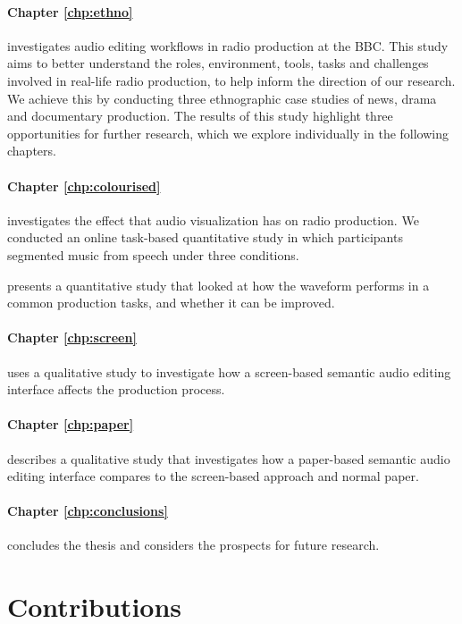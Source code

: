 \paragraph{Chapter \ref{chp:ethno}} investigates audio editing workflows in radio production at the BBC.  This study
aims to better understand the roles, environment, tools, tasks and challenges involved in real-life radio production,
to help inform the direction of our research.  We achieve this by conducting three ethnographic case studies
of news, drama and documentary production.  The results of this study highlight three opportunities for further
research, which we explore individually in the following chapters.

\paragraph{Chapter \ref{chp:colourised}} investigates the effect that audio visualization has on radio production. We
conducted an online task-based quantitative study in which participants segmented music from speech under three
conditions.

presents a quantitative study that looked at how the waveform performs in a
common production tasks, and whether it can be improved.

\paragraph{Chapter \ref{chp:screen}} uses a qualitative study to investigate how a screen-based semantic audio editing
interface affects the production process.

\paragraph{Chapter \ref{chp:paper}} describes a qualitative study that investigates how a paper-based semantic audio
editing interface compares to the screen-based approach and normal paper.

\paragraph{Chapter \ref{chp:conclusions}} concludes the thesis and considers the prospects for future research.

\section{Contributions}\label{sec:intro-contributions}

